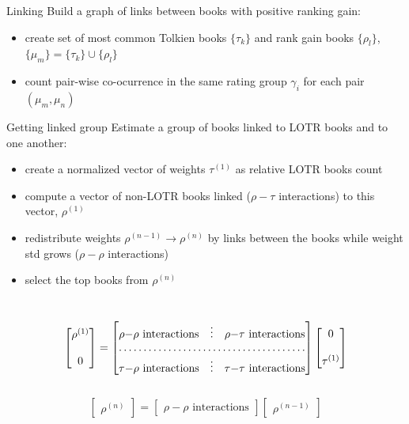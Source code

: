 \documentclass[9pt]{beamer}
\begin{document}
\begin{frame}{Linking}
	Build a graph of links between books with positive ranking gain:\\
	\begin{itemize}
		\item create set of most common Tolkien books $\{\tau_k\}$ and rank gain books $\{\rho_l\}$, $\{\mu_m\}=\{\tau_k\}\cup\{\rho_l\}$
		\item count pair-wise co-ocurrence in the same rating group $\gamma_i$ for each pair $(\mu_m,\mu_n)$
	\end{itemize}
\end{frame}


\begin{frame}{Getting linked group}
	Estimate a group of books linked to LOTR books and to one another:\\
	\begin{itemize}
		\item create a normalized vector of weights $\tau^{(1)}$ as relative LOTR books count
		\item compute a vector of non-LOTR books linked ($\rho{-}\tau$ interactions) to this vector, $\rho^{(1)}$
		\item redistribute weights $\rho^{(n-1)} \rightarrow \rho^{(n)}$  by links between the books while weight std grows ($\rho{-}\rho$ interactions)
		\item select the top books from $\rho^{(n)}$
	\end{itemize}
	\\[1em]
	\begin{equation*}
		\begin{bmatrix}
			\rho^{(1)} \\
			{} \\
			0
		\end{bmatrix}
		=
		\begin{bmatrix}
			\rho{-}\rho \text{ interactions} & \vdots & \rho{-}\tau \text{ interactions} \\
			\hdotsfor{3} \\
			\tau{-}\rho \text{ interactions} & \vdots & \tau{-}\tau \text{ interactions}
		\end{bmatrix}
		\begin{bmatrix}
			0  \\
			{} \\
			\tau^{(1)}
		\end{bmatrix}
	\end{equation*}	
	\\[1em]
	\begin{equation*}
		\begin{bmatrix}
			\rho^{(n)}
		\end{bmatrix}
		=
		\begin{bmatrix}
			\rho{-}\rho \text{ interactions}
		\end{bmatrix}
		\begin{bmatrix}
			\rho^{(n-1)}
		\end{bmatrix}
	\end{equation*}
\end{frame}
\end{document}
